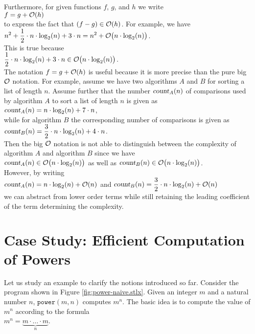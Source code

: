 Furthermore, for given functions $f$, $g$, and $h$ we write
\\[0.2cm]
\hspace*{1.3cm}
$f = g + \mathcal{O}(h)$
\\[0.2cm]
to express the fact that  $(f - g) \in \mathcal{O}(h)$.  For example, we have 
\\[0.2cm]
\hspace*{1.3cm}
$\displaystyle n^2 + \frac{1}{2} \cdot n \cdot \log_2(n) + 3 \cdot n = n^2 + \mathcal{O}\bigl(n \cdot \log_2(n)\bigr)$.
\\[0.2cm]
This is true because
\\[0.2cm]
\hspace*{1.3cm}
$\displaystyle\frac{1}{2} \cdot n \cdot \log_2(n) + 3 \cdot n \in \mathcal{O}\bigl(n \cdot \log_2(n)\bigr)$.
\\[0.2cm] 
The notation $f = g + \mathcal{O}(h)$ is useful because it is more precise than the pure big $\mathcal{O}$
notation.  For example, assume we have two algorithms $A$ and $B$ for sorting a list of length
$n$.  Assume further that the number $\textsl{count}_A(n)$ of comparisons used by algorithm $A$ to sort a list of
length $n$ is given as
\\[0.2cm]
\hspace*{1.3cm}
$\displaystyle\textsl{count}_A(n) = n \cdot \log_2(n) + 7 \cdot n$,
\\[0.2cm]
while for algorithm $B$ the corresponding number of comparisons is given as
\\[0.2cm]
\hspace*{1.3cm}
$\displaystyle\textsl{count}_B(n) = \frac{3}{2} \cdot n \cdot \log_2(n) + 4 \cdot n$.
\\[0.2cm]
Then the big $\mathcal{O}$ notation is not able to distinguish between the complexity of algorithm $A$ and
algorithm $B$ since we have
\\[0.2cm]
\hspace*{1.3cm}
$\textsl{count}_A(n) \in \mathcal{O}\bigl(n \cdot \log_2(n)\bigr)$ \quad as well as \quad
$\textsl{count}_B(n) \in \mathcal{O}\bigl(n \cdot \log_2(n)\bigr)$.
\\[0.2cm]
However, by writing
\\[0.2cm]
\hspace*{1.3cm}
$\displaystyle\textsl{count}_A(n) = n \cdot \log_2(n) + \mathcal{O}(n)$ \quad and \quad
$\displaystyle\textsl{count}_B(n) = \frac{3}{2} \cdot n \cdot \log_2(n) + \mathcal{O}(n)$
\\[0.2cm]
we can abstract from lower order terms while still retaining the leading coefficient of the term
determining the complexity.  

\section[Computation of Powers]{Case Study:  Efficient Computation of Powers}
Let us study an example to clarify the notions introduced so far.  
Consider the program shown in Figure \ref{fig:power-naive.stlx}.  Given an integer $m$ and a
natural number $n$, $\mathtt{power}(m, n)$ computes $m^n$.
The basic idea is to compute the value of $m^n$ according to the formula \\[0.2cm]
\hspace*{1.3cm} 
$m^n = \underbrace{m \cdot {\dots} \cdot m}_n$. 


